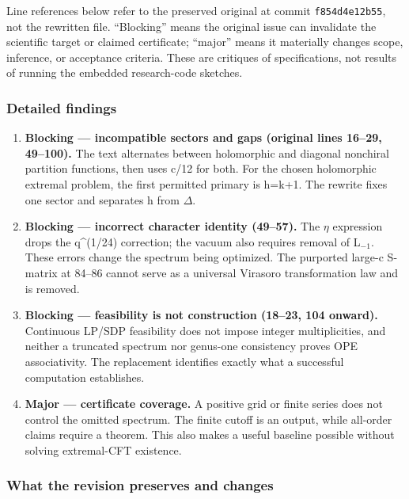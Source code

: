 \documentclass[
  11pt,
]{article}
\begin{document}
Line references below refer to the preserved original at commit
\texttt{f854d4e12b55}, not the rewritten file. ``Blocking'' means the
original issue can invalidate the scientific target or claimed
certificate; ``major'' means it materially changes scope, inference, or
acceptance criteria. These are critiques of specifications, not results
of running the embedded research-code sketches.

\subsubsection{Detailed findings}

\begin{enumerate}
\def\labelenumi{\arabic{enumi}.}
\item
  \textbf{Blocking --- incompatible sectors and gaps (original lines
  16--29, 49--100).} The text alternates between holomorphic and
  diagonal nonchiral partition functions, then uses c/12 for both. For
  the chosen holomorphic extremal problem, the first permitted primary
  is h=k+1. The rewrite fixes one sector and separates h from
  \ensuremath{\Delta}.
\item
  \textbf{Blocking --- incorrect character identity (49--57).} The
  \ensuremath{\eta} expression drops the q\^{}(1/24) correction; the
  vacuum also requires removal of L\ensuremath{{}_{-1}}. These errors
  change the spectrum being optimized. The purported large-c S-matrix at
  84--86 cannot serve as a universal Virasoro transformation law and is
  removed.
\item
  \textbf{Blocking --- feasibility is not construction (18--23, 104
  onward).} Continuous LP/SDP feasibility does not impose integer
  multiplicities, and neither a truncated spectrum nor genus-one
  consistency proves OPE associativity. The replacement identifies
  exactly what a successful computation establishes.
\item
  \textbf{Major --- certificate coverage.} A positive grid or finite
  series does not control the omitted spectrum. The finite cutoff is an
  output, while all-order claims require a theorem. This also makes a
  useful baseline possible without solving extremal-CFT existence.
\end{enumerate}

\subsubsection{What the revision preserves and changes}
\end{document}
